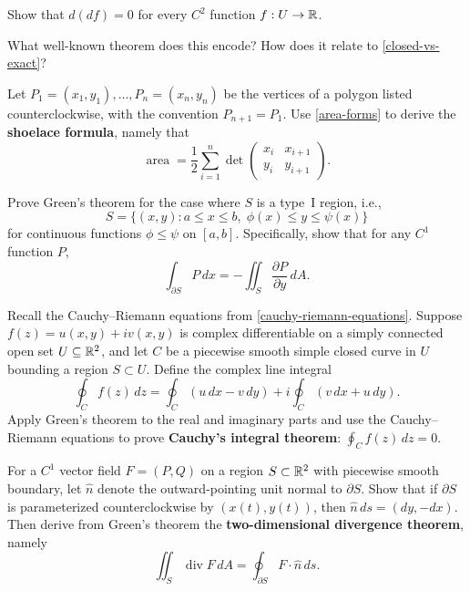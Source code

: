 \documentclass{homework}
\begin{document}
\begin{problem}\label{dd-zero}%
  Show that $d(df) = 0$ for every $C^2$ function $f:U\to\mathbb{R}$.
  
  What well-known theorem does this encode?
  How does it relate to \ref{closed-vs-exact}?
\end{problem}

\begin{problem}\label{shoelace}%
  Let $P_1=(x_1,y_1),\dots,P_n=(x_n,y_n)$ be the vertices of a polygon listed counterclockwise, with the convention $P_{n+1}=P_1$.
  Use \ref{area-forms} to derive the \textbf{shoelace formula}, namely that
    \[
      \operatorname{area} = \frac{1}{2}\sum_{i=1}^{n}\det\begin{pmatrix}x_i & x_{i+1}\\ y_i & y_{i+1}\end{pmatrix}.
    \]
\end{problem}

\begin{problem}\label{green-proof}%
  Prove Green's theorem for the case where $S$ is a type~I region, i.e.,
  \[
    S = \{(x,y) : a \le x \le b, \; \phi(x) \le y \le \psi(x)\}
  \]
  for continuous functions $\phi \le \psi$ on $[a,b]$.
  Specifically, show that for any $C^1$ function $P$,
  \[
    \int_{\partial S} P\,dx = -\iint_S \frac{\partial P}{\partial y}\,dA.
  \]
\end{problem}

\begin{problem}\label{green-cauchy}%
  Recall the Cauchy--Riemann equations from \ref{cauchy-riemann-equations}.
  Suppose $f(z) = u(x,y)+iv(x,y)$ is complex differentiable on a simply connected open set $U\subseteq\mathbb{R}^2$, and let $C$ be a piecewise smooth simple closed curve in $U$ bounding a region $S\subset U$.
  Define the complex line integral
  \[
    \oint_C f(z)\,dz = \oint_C(u\,dx-v\,dy)+i\oint_C(v\,dx+u\,dy).
  \]
  Apply Green's theorem to the real and imaginary parts and use the Cauchy--Riemann equations to prove \textbf{Cauchy's integral theorem}: $\displaystyle\oint_C f(z)\,dz=0$.
\end{problem}


\begin{problem}\label{divergence-2d}%
  For a $C^1$ vector field $F = (P,Q)$ on a region $S\subset\mathbb{R}^2$ with piecewise smooth boundary, let $\hat n$ denote the outward-pointing unit normal to $\partial S$.
  Show that if $\partial S$ is parameterized counterclockwise by $(x(t),y(t))$, then $\hat n\,ds = (dy,-dx)$.
  Then derive from Green's theorem the \textbf{two-dimensional divergence theorem}, namely
  \[
    \iint_S \operatorname{div} F\,dA = \oint_{\partial S} F\cdot\hat n\,ds.
  \]
\end{problem}
\end{document}
